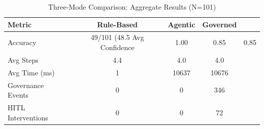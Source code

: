 \begin{table}[h]
\centering
\caption{Three-Mode Comparison: Aggregate Results (N=101)}
\label{tab:mode_comparison}
\small
\begin{tabular}{lccc}
\hline
\textbf{Metric} & \textbf{Rule-Based} & \textbf{Agentic} & \textbf{Governed} \\
\hline
Accuracy & 49/101 (48.5%
Avg Confidence & 1.00 & 0.85 & 0.85 \\
Avg Steps & 4.4 & 4.0 & 4.0 \\
Avg Time (ms) & 1 & 10637 & 10676 \\
Governance Events & 0 & 0 & 346 \\
HITL Interventions & 0 & 0 & 72 \\
\hline
\end{tabular}
\end{table}
